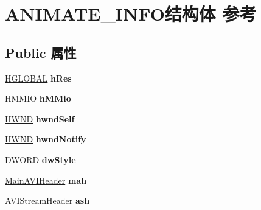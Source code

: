 \hypertarget{struct_a_n_i_m_a_t_e___i_n_f_o}{}\section{A\+N\+I\+M\+A\+T\+E\+\_\+\+I\+N\+F\+O结构体 参考}
\label{struct_a_n_i_m_a_t_e___i_n_f_o}
\subsection*{Public 属性}
\begin{DoxyCompactItemize}
\item 
\mbox{\label{struct_a_n_i_m_a_t_e___i_n_f_o_aacd53b7fe7614c54ea25ca43af9ec9f6}} 
\hyperlink{interfacevoid}{H\+G\+L\+O\+B\+AL} {\bfseries h\+Res}
\item 
\mbox{\label{struct_a_n_i_m_a_t_e___i_n_f_o_a81c61e9f5f550a7e7696d4810c126bfc}} 
H\+M\+M\+IO {\bfseries h\+M\+Mio}
\item 
\mbox{\label{struct_a_n_i_m_a_t_e___i_n_f_o_ad3a3db6f3b383f5bb593d7d85ed0afa2}} 
\hyperlink{interfacevoid}{H\+W\+ND} {\bfseries hwnd\+Self}
\item 
\mbox{\label{struct_a_n_i_m_a_t_e___i_n_f_o_a6e3a8dc2f154cd0a66c7e7a0ed41a677}} 
\hyperlink{interfacevoid}{H\+W\+ND} {\bfseries hwnd\+Notify}
\item 
\mbox{\label{struct_a_n_i_m_a_t_e___i_n_f_o_a2b2791f55e32e980c01abbb5df899958}} 
D\+W\+O\+RD {\bfseries dw\+Style}
\item 
\mbox{\label{struct_a_n_i_m_a_t_e___i_n_f_o_a240f780d10774021ff1693063e055614}} 
\hyperlink{struct___main_a_v_i_header}{Main\+A\+V\+I\+Header} {\bfseries mah}
\item 
\mbox{\label{struct_a_n_i_m_a_t_e___i_n_f_o_ad5ccdd3fdfca7b6d880a20a7823fa947}} 
\hyperlink{struct_a_v_i_stream_header}{A\+V\+I\+Stream\+Header} {\bfseries ash}
\item 
\mbox{\label{struct_a_n_i_m_a_t_e___i_n_f_o_a886a19e4be98b3c90eb227f0906f5ead}} 

\end{DoxyCompactItemize}

